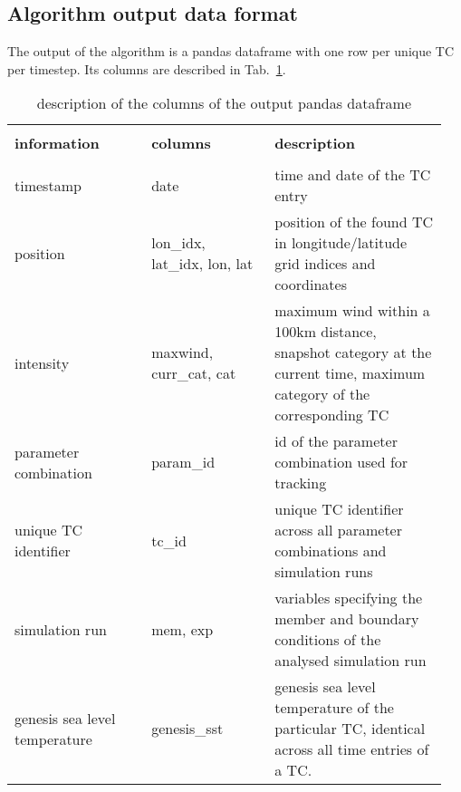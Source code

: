 \subsection{Algorithm output data format}
The output of the algorithm is a pandas dataframe with one row per unique TC per timestep. Its columns are described in Tab.~\ref{tab:output-data}.
\begingroup
\begin{table}[]
	\centering
	\begin{tabular}{| p{0.3\linewidth} | p{0.27\linewidth} | p{0.38\linewidth }|}
		\hline
		                              &                              &                                                                                        \\[-0.5em]
		\textbf{information}          & \textbf{columns}             & \textbf{description}                                                                   \\[5pt] \hline
		                              &                              &                                                                                        \\[-0.5em]
		timestamp                     & date                         & time and date of the TC entry                                                          \\[5pt]
		position                      & lon\_idx, lat\_idx, lon, lat & position of the found TC in longitude/latitude grid indices and coordinates            \\[5pt]
		intensity                     &
		maxwind, curr\_cat, cat       &
		maximum wind within a 100km distance, snapshot category at the current time, maximum category of the corresponding TC                                 \\[5pt]
		parameter combination         & param\_id                    & id of the parameter combination used for tracking                                      \\[5pt]
		unique TC identifier          & tc\_id                       & unique TC identifier across all parameter combinations and simulation runs             \\[5pt]
		simulation run                & mem, exp                     & variables specifying the member and boundary conditions of the analysed simulation run \\[5pt]
		genesis sea level temperature &
		genesis\_sst                  &
		genesis sea level temperature of the particular TC, identical across all time entries of a TC.                                                        \\[5pt] \hline
	\end{tabular}
	\caption{description of the columns of the output pandas dataframe \cite{pandas}}
	\label{tab:output-data}
\end{table}
\endgroup
